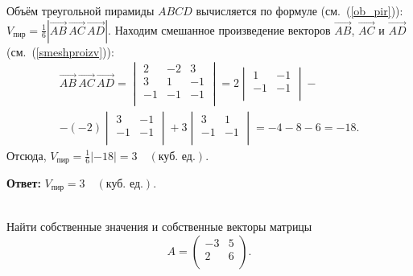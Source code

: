 \documentclass[10pt]{article}
\numberwithin{primer}{section}
\numberwithin{equation}{section}
\begin{document}
Объём треугольной пирамиды $ABCD$ вычисляется по формуле (см.~(\ref{ob_pir})): $V_{\text{пир}}=\tfrac{1}{6}\left|\overrightarrow{AB}\,\overrightarrow{AC}\,\overrightarrow{AD}\right|$. Находим смешанное произведение векторов $\overrightarrow{AB}$, $\overrightarrow{AC}$ и $\overrightarrow{AD}$ (см.~(\ref{smeshproizv})):
\begin{multline*}
\overrightarrow{AB}\,\overrightarrow{AC}\,\overrightarrow{AD}=\begin{vmatrix}
2 & -2 & 3\\
3 & 1 & -1\\
-1 & -1 & -1\\
\end{vmatrix}=2\begin{vmatrix}
1 & -1\\
-1 & -1\\
\end{vmatrix}-\\-(-2)\begin{vmatrix}
3 & -1\\
-1 & -1\\
\end{vmatrix}+3\begin{vmatrix}
3 & 1\\
-1 & -1\\
\end{vmatrix}=-4-8-6=-18.
\end{multline*}
Отсюда, $V_{\text{пир}}=\tfrac{1}{6}\left|-18\right|=3\quad(\text{куб. ед.}).$

\noindent\textbf{Ответ: }$V_{\text{пир}}=3\quad(\text{куб. ед.})$.\vspace{4pt}

\noindent\hrulefill\,\,\hrulefill\vspace{4pt}\label{sob2}\\
Найти собственные значения и собственные векторы матрицы
\[A=\begin{pmatrix}
-3 & 5\\
2 & 6\\
\end{pmatrix}.
\]

\noindent{}\,\hrulefill\vspace{4pt}
\end{document}
